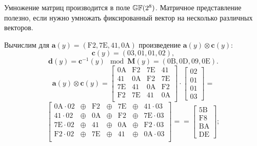 Умножение матриц производится в поле $\mathbb{GF}(2^8)$. Матричное представление полезно, если нужно умножать фиксированный вектор на несколько различных векторов.

\example
Вычислим для $\mathbf{a}(y) = (\mathrm{F2}, \mathrm{7E}, \mathrm{41}, \mathrm{0A})$ произведение $\mathbf{a}(y) \otimes \mathbf{c}(y)$:
\[
    \mathbf{c}(y) = (03, 01, 01, 02),
\] \[
    \mathbf{d}(y) = \mathbf{c}^{-1}(y) \mod \mathbf{M}(y) = (\mathrm{0B}, \mathrm{0D}, \mathrm{09}, \mathrm{0E}).
\] \[
    \mathbf{a}(y) \otimes \mathbf{c}(y) =
    \left[ \begin{array}{cccc}
        \mathrm{0A} & \mathrm{F2} & \mathrm{7E} & \mathrm{41} \\
        \mathrm{41} & \mathrm{0A} & \mathrm{F2} & \mathrm{7E} \\
        \mathrm{7E} & \mathrm{41} & \mathrm{0A} & \mathrm{F2} \\
        \mathrm{F2} & \mathrm{7E} & \mathrm{41} & \mathrm{0A} \\
    \end{array} \right] \cdot
    \left[ \begin{array}{c} \mathrm{02} \\ \mathrm{01} \\ \mathrm{01} \\ \mathrm{03} \end{array} \right] =
\] \[
    \left[ \begin{array}{ccccccc}
        \mathrm{0A} \cdot \mathrm{02} & \oplus & \mathrm{F2} & \oplus & \mathrm{7E} & \oplus & \mathrm{41} \cdot \mathrm{03} \\
        \mathrm{41} \cdot \mathrm{02} & \oplus & \mathrm{0A} & \oplus & \mathrm{F2} & \oplus & \mathrm{7E} \cdot \mathrm{03} \\
        \mathrm{7E} \cdot \mathrm{02} & \oplus & \mathrm{41} & \oplus & \mathrm{0A} & \oplus & \mathrm{F2} \cdot \mathrm{03} \\
        \mathrm{F2} \cdot \mathrm{02} & \oplus & \mathrm{7E} & \oplus & \mathrm{41} & \oplus & \mathrm{0A} \cdot \mathrm{03} \\
    \end{array} \right] =
    =\left[ \begin{array}{c} \mathrm{5B} \\ \mathrm{F8} \\ \mathrm{BA} \\ \mathrm{DE} \end{array} \right];
\] \[
    \begin{array}{l}

\end{array}\]

